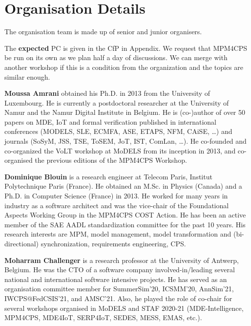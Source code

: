 \section{Organisation Details}
\label{sec:Organisation}



The organisation team is made up of senior and junior organisers.

The \textbf{expected} PC is given in the CfP in Appendix.
We request that MPM4CPS be run on its own as we plan half a day of discussions.
We can merge with another workshop if this is a condition from the organization 
and the topics are similar enough.

\medskip
\noindent
\textbf{Moussa Amrani} obtained his Ph.D. in 2013 from the University of Luxembourg. 
He is currently a postdoctoral researcher at the University of Namur and the Namur Digital Institute in Belgium. 
He is (co-)author of over 50 papers on MDE, IoT and formal verification published in international conferences (MODELS, SLE, ECMFA, ASE, ETAPS, NFM, CAiSE, \ldots) and journals (SoSyM, JSS, TSE, ToSEM, JoT, IST, ComLan, \ldots). He co-founded and co-organized the VoLT workshop at MoDELS from its inception in 2013, and co-organised
the previous editions of the MPM4CPS Workshop.

\medskip
\noindent
\textbf{Dominique Blouin} is a research engineer at Telecom Paris, Institut Polytechnique Paris 
(France). He obtained an M.Sc. in Physics (Canada) and a Ph.D. in Computer Science (France) in 2013. He worked for many years in industry as a software architect and was the vice-chair of the Foundational Aspects Working Group in the MPM4CPS COST Action. He has been an active member of the SAE AADL standardization committee for the past 10 years. His research interests are MPM, model management, model transformation and (bi-directional) synchronization, requirements engineering, CPS.

\medskip
\noindent
\textbf{Moharram Challenger} is a research professor at the University of Antwerp, Belgium. He was the CTO of a software company involved-in/leading several national and international software intensive projects. He has served as an organisation committee member for SummerSim'20, ICSMM'20, AnnSim'21, IWCPS@FedCSIS'21, and AMSC'21. Also, he played the role of co-chair for several workshops organised in MoDELS and STAF 2020-21 (MDE-Intelligence, MPM4CPS, MDE4IoT, SERP4IoT, SEDES, MESS, EMAS, etc.).

